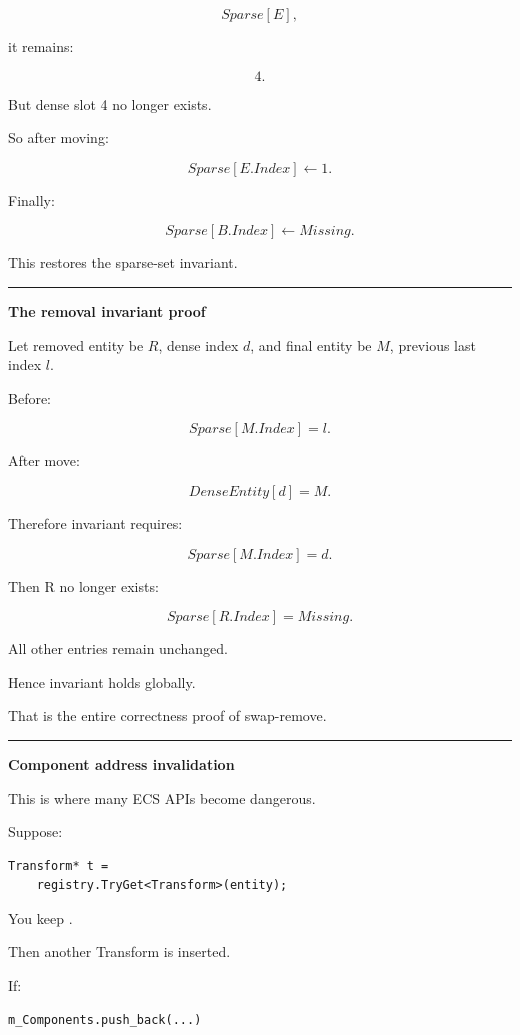 \[
Sparse[E],
\]

it remains:

\[
4.
\]

But dense slot 4 no longer exists.

So after moving:

\[
\boxed{
Sparse[E.Index]\leftarrow1.
}
\]

Finally:

\[
Sparse[B.Index]\leftarrow Missing.
\]

This restores the sparse-set invariant.

\begin{center}\rule{0.5\linewidth}{0.5pt}\end{center}

\textbf{The removal invariant proof}

Let removed entity be \(R\), dense index \(d\), and final entity be \(M\), previous last index \(l\).

Before:

\[
Sparse[M.Index]=l.
\]

After move:

\[
DenseEntity[d]=M.
\]

Therefore invariant requires:

\[
Sparse[M.Index]=d.
\]

Then R no longer exists:

\[
Sparse[R.Index]=Missing.
\]

All other entries remain unchanged.

Hence invariant holds globally.

That is the entire correctness proof of swap-remove.

\begin{center}\rule{0.5\linewidth}{0.5pt}\end{center}

\textbf{Component address invalidation}

This is where many ECS APIs become dangerous.

Suppose:

\begin{verbatim}
Transform* t =
    registry.TryGet<Transform>(entity);
\end{verbatim}

You keep .

Then another Transform is inserted.

If:

\begin{verbatim}
m_Components.push_back(...)
\end{verbatim}

